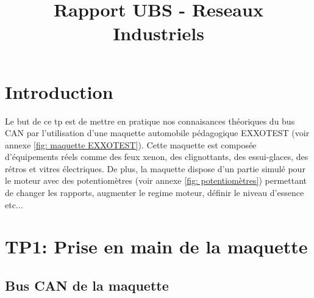 \documentclass{rapportECC}
\title{Rapport UBS - Reseaux Industriels} %
\begin{document}





        
\fairemarges %
\fairepagedegarde %
\tabledematieres %



\section{Introduction} 

Le but de ce tp est de mettre en pratique nos connaisances théoriques du bus CAN par l'utilisation d'une maquette automobile pédagogique EXXOTEST (voir annexe \ref{fig: maquette EXXOTEST}). Cette maquette est composée d'équipements réels comme des feux xenon, des clignottants, des essui-glaces, des rétros et vitres électriques. De plus, la maquette dispose d'un partie simulé pour le moteur avec des potentiomètres (voir annexe \ref{fig: potentiomètres}) permettant de changer les rapports, augmenter le regime moteur, définir le niveau d'essence etc... 


\section{TP1: Prise en main de la maquette}


\subsection{Bus CAN de la maquette}
\end{document}
